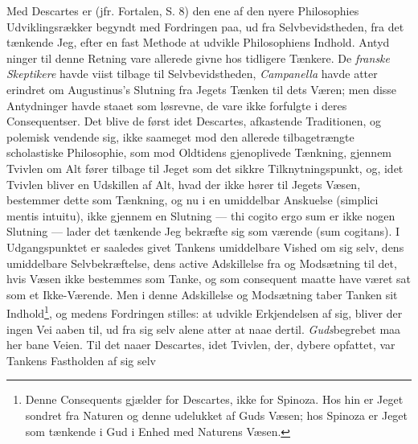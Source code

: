 \documentclass[12pt,a4paper]{book}
\newcommand{\opage}[1]{\marginnote{\footnotesize\textit{[#1]}}}
\begin{document}
Med Descartes er (jfr. Fortalen, S. 8) den ene af den nyere Philosophies
Udviklingsrækker begyndt med Fordringen paa, ud fra Selvbevidstheden, fra
det tænkende Jeg, efter en fast Methode at udvikle Philosophiens Indhold.
Antyd\-%
\opage{18}\setcounter{footnote}{0}%
ninger til denne Retning vare allerede givne hos tidligere Tænkere. De
\emph{franske Skeptikere} havde viist tilbage til Selvbevidstheden,
\emph{Campanella} havde atter erindret om Augustinus's Slutning fra
Jegets Tænken til dets Væren; men disse Antydninger havde staaet som
løsrevne, de vare ikke forfulgte i deres Consequentser. Det blive de
først idet Descartes, afkastende Traditionen, og polemisk vendende sig,
ikke saameget mod den allerede tilbagetrængte scholastiske Philosophie,
som mod Oldtidens gjenoplivede Tænkning, gjennem Tvivlen om Alt fører
tilbage til Jeget som det sikkre Tilknytningspunkt, og, idet Tvivlen
bliver en Udskillen af Alt, hvad der ikke hører til Jegets Væsen,
bestemmer dette som Tænkning, og nu i en umiddelbar Anskuelse (simplici
mentis intuitu), ikke gjennem en Slutning --- thi cogito ergo sum er ikke
nogen Slutning --- lader det tænkende Jeg bekræfte sig som værende (sum
cogitans). I Udgangspunktet er saaledes givet Tankens umiddelbare Vished
om sig selv, dens umiddelbare Selvbekræftelse, dens active Adskillelse
fra og Modsætning til det, hvis Væsen ikke bestemmes som Tanke, og som
consequent maatte have været sat som et Ikke-Værende. Men i denne
Adskillelse og Modsætning taber Tanken sit
Indhold\footnote{Denne Consequents gjælder for Descartes, ikke for
Spinoza. Hos hin er Jeget sondret fra Naturen og denne udelukket af Guds
Væsen; hos Spinoza er Jeget som tænkende i Gud i Enhed med Naturens
Væsen.}, og medens Fordringen stilles: at udvikle Erkjendelsen af sig,
bliver der ingen Vei aaben til, ud fra sig selv alene atter at naae
dertil. \emph{Guds}begrebet maa her bane Veien. Til det naaer Descartes,
idet Tvivlen, der, dybere opfattet, var Tankens Fastholden af sig selv
\end{document}
